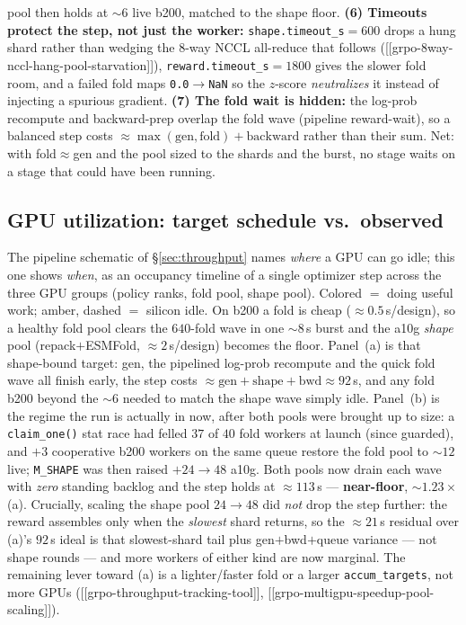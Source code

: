 \documentclass[11pt]{article}
\newcommand{\ttk}[1]{\texttt{\small #1}}
\begin{document}
pool then holds at $\sim\!6$ live b200, matched to the shape floor. \textbf{(6) Timeouts protect the step, not just the
worker:} \ttk{shape.timeout\_s}$=600$ drops a hung shard rather than wedging the $8$-way NCCL
all-reduce that follows ([[grpo-8way-nccl-hang-pool-starvation]]), \ttk{reward.timeout\_s}$=1800$ gives
the slower fold room, and a failed fold maps \ttk{0.0}$\to$\ttk{NaN} so the $z$-score \emph{neutralizes}
it instead of injecting a spurious gradient. \textbf{(7) The fold wait is hidden:} the log-prob
recompute and backward-prep overlap the fold wave (pipeline reward-wait), so a balanced step costs
$\approx\max(\text{gen},\text{fold})+\text{backward}$ rather than their sum. Net: with fold$\approx$gen
and the pool sized to the shards and the burst, no stage waits on a stage that could have been running.

\subsection{GPU utilization: target schedule vs.\ observed}
\label{sec:gpuutil}
The pipeline schematic of \S\ref{sec:throughput} names \emph{where} a GPU can go idle; this one shows
\emph{when}, as an occupancy timeline of a single optimizer step across the three GPU groups (policy
ranks, fold pool, shape pool). Colored $=$ doing useful work; \textcolor{bLine}{amber, dashed} $=$
silicon idle. On b200 a fold is cheap ($\approx\!0.5$\,s/design), so a healthy fold pool clears the
$640$-fold wave in one $\sim\!8$\,s burst and the a10g \emph{shape} pool (repack$+$ESMFold,
$\approx\!2$\,s/design) becomes the floor. Panel~(a) is that shape-bound target: gen,
the pipelined log-prob recompute and the quick fold wave all finish early, the step costs
$\approx\text{gen}+\text{shape}+\text{bwd}\approx92$\,s, and any fold b200 beyond the $\sim\!6$ needed to
match the shape wave simply idle. Panel~(b) is the regime the run is actually in now, after both pools
were brought up to size: a \ttk{claim\_one()} stat race had felled $37$ of $40$ fold workers at launch
(since guarded), and $+3$ cooperative b200 workers on the same queue restore the fold pool to $\sim\!12$
live; \ttk{M\_SHAPE} was then raised $+24\to48$ a10g. Both pools now drain each wave with \emph{zero}
standing backlog and the step holds at $\approx\!113$\,s --- \textbf{near-floor}, $\sim\!1.23\times$ (a).
Crucially, scaling the shape pool $24\to48$ did \emph{not} drop the step further: the reward assembles
only when the \emph{slowest} shard returns, so the $\approx\!21$\,s residual over (a)'s $92$\,s ideal is
that slowest-shard tail plus gen$+$bwd$+$queue variance --- not shape rounds --- and more workers of
either kind are now marginal. The remaining lever toward (a) is a lighter/faster fold or a larger
\ttk{accum\_targets}, not more GPUs ([[grpo-throughput-tracking-tool]], [[grpo-multigpu-speedup-pool-scaling]]).
\end{document}
